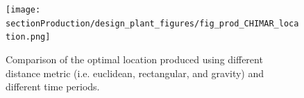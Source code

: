 \begin{figure}[hbt!]
\centering
\texttt{[image: sectionProduction/design\_plant\_figures/fig\_prod\_CHIMAR\_location.png]}
\captionsetup{type=figure}
\caption{Comparison of the optimal location produced using different distance metric (i.e. euclidean, rectangular, and gravity) and different time periods.}
\label{fig_prod_CHIMAR_location}
\end{figure}







\clearpage

